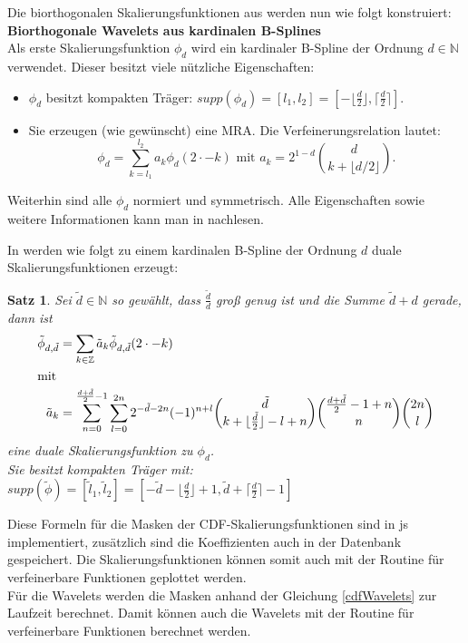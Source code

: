 \documentclass[11pt,a4paper,titlepage]{article}
\theoremstyle{plain} %
\newtheorem{satz}{Satz}[section] %
\theoremstyle{definition} %
\numberwithin{equation}{section} %
\begin{document}
		Die biorthogonalen Skalierungsfunktionen aus \cite{CohenDaubechiesFeauveau} werden nun wie folgt konstruiert:\\
		
		\textbf{Biorthogonale Wavelets aus kardinalen B-Splines}\\
			Als erste Skalierungsfunktion $\phi_d$ wird ein kardinaler B-Spline der Ordnung $d\in \mathbb{N}$ verwendet. Dieser besitzt viele nützliche Eigenschaften: 
		\begin{itemize}
			\item $\phi_d$ besitzt kompakten Träger: $supp(\phi_d)=[l_1,l_2]=[-\lfloor \frac{d}{2} \rfloor, \lceil \frac{d}{2} \rceil]$.
			\item Sie erzeugen (wie gewünscht) eine MRA. Die Verfeinerungsrelation lautet:
				\begin{equation}
					 \phi_d = \sum_{k=l_1}^{l_2} a_k \phi_d(2\cdot -k)  \text{ mit } a_k=2^{1-d} \binom{d}{k+\lfloor d/2 \rfloor}.
				\end{equation} 
		\end{itemize}
		
		Weiterhin sind alle $\phi_d$ normiert und symmetrisch. 
		Alle Eigenschaften sowie weitere Informationen kann man in \cite{Schumaker2007} nachlesen.
		
		In \cite{CohenDaubechiesFeauveau} werden wie folgt zu einem kardinalen B-Spline der Ordnung $d$ duale Skalierungsfunktionen erzeugt:\\
		\begin{satz}	
			Sei $\tilde{d}\in \mathbb{N}$ so gewählt, dass $\frac{\tilde{d}}{d}$ groß genug ist und die Summe $\tilde{d}+d$ gerade, dann ist 		
			\begin{align}
				\tilde{\phi}_{d,\tilde{d}} &= \sum_{k\in \mathbb{Z}} \tilde{a}_k \tilde{\phi}_{d,\tilde{d}}(2\cdot -k)\\
				\intertext{mit}		
				\tilde{a}_k&=\sum_{n=0}^{\frac{d+\tilde{d}}{2}-1}\sum_{l=0}^{2n}2^{-\tilde{d}-2n}(-1)^{n+l}\binom{\tilde{d}}{k+\lfloor\frac{\tilde{d}}{2}\rfloor-l+n}
				\binom{\frac{d+\tilde{d}}{2}-1+n}{n}\binom{2n}{l}
			\end{align} 
			eine duale Skalierungsfunktion zu $\phi_d$.\\
			Sie besitzt kompakten Träger mit: $supp(\tilde{\phi})=[\tilde{l}_1,\tilde{l}_2]=
			[-\tilde{d}-\lfloor \frac{d}{2} \rfloor+1, \tilde{d}+\lceil \frac{d}{2} \rceil -1]$
		\end{satz}
		
		Diese Formeln für die Masken der CDF-Skalierungsfunktionen sind in js implementiert, zusätzlich sind die Koeffizienten auch in der Datenbank gespeichert.
		Die Skalierungsfunktionen können somit auch mit der Routine für verfeinerbare Funktionen geplottet werden.\\
		Für die Wavelets werden die Masken anhand der Gleichung \ref*{cdfWavelets} zur Laufzeit berechnet. Damit können auch die Wavelets mit der Routine für verfeinerbare Funktionen berechnet werden.\\
		
\end{document}
